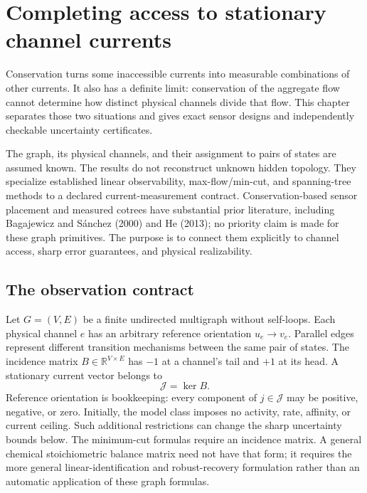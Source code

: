\chapter{Completing access to stationary channel currents}
\label{ch:graph-access}

Conservation turns some inaccessible currents into measurable combinations of
other currents. It also has a definite limit: conservation of the aggregate
flow cannot determine how distinct physical channels divide that flow. This
chapter separates those two situations and gives exact sensor designs and
independently checkable uncertainty certificates.

The graph, its physical channels, and their assignment to pairs of states are
assumed known. The results do not reconstruct unknown hidden topology. They
specialize established linear observability, max-flow/min-cut, and spanning-tree
methods to a declared current-measurement contract. Conservation-based sensor
placement and measured cotrees have substantial prior literature, including
Bagajewicz and S\'anchez (2000) and He (2013); no priority claim is made for these
graph primitives. The purpose is to connect them explicitly to channel access,
sharp error guarantees, and physical realizability.

\section{The observation contract}

Let $G=(V,E)$ be a finite undirected multigraph without self-loops. Each physical
channel $e$ has an arbitrary reference orientation $u_e\to v_e$. Parallel edges
represent different transition mechanisms between the same pair of states.
The incidence matrix $B\in\mathbb R^{V\times E}$ has $-1$ at a channel's tail
and $+1$ at its head. A stationary current vector belongs to
\begin{equation}
 \mathcal J=\ker B.
 \label{eq:graph-current-class}
\end{equation}
Reference orientation is bookkeeping: every component of $j\in\mathcal J$
may be positive, negative, or zero. Initially, the model class imposes no
activity, rate, affinity, or current ceiling. Such additional restrictions can
change the sharp uncertainty bounds below.
The minimum-cut formulas require an incidence matrix. A general chemical
stoichiometric balance matrix need not have that form; it requires the more
general linear-identification and robust-recovery formulation rather than an
automatic application of these graph formulas.

